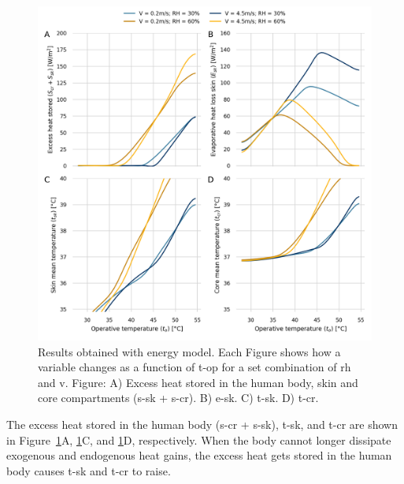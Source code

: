 \begin{figure}[thb!]
    \centering
    \includegraphics[width=\textwidth]{figures/results_model_2}
    \caption{Results obtained with  energy model.
    Each Figure shows how a variable changes as a function of \ac{t-op} for a set combination of \ac{rh} and \ac{v}.
    Figure: A)  Excess heat stored in the human body, skin and core compartments (\ac{s-sk} + \ac{s-cr}).
    B) \Acf{e-sk}.
    C) \Acf{t-sk}.
    D) \Acf{t-cr}.}
    \label{fig:results_model_2}
\end{figure}

The excess heat stored in the human body (\acs{s-cr} + \acs{s-sk}), \ac{t-sk}, and \ac{t-cr} are shown in Figure~\ref{fig:results_model_2}A, \ref{fig:results_model_2}C, and \ref{fig:results_model_2}D, respectively.
When the body cannot longer dissipate exogenous and endogenous heat gains, the excess heat gets stored in the human body causes \ac{t-sk} and \ac{t-cr} to raise.


